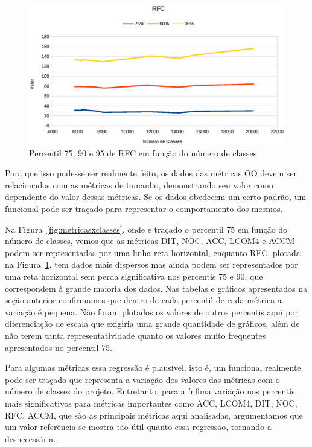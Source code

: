 \begin{figure}[!htb]
\centering
\includegraphics [keepaspectratio=true,scale=0.7]{figuras/rfcxclasses.eps}
\caption{Percentil 75, 90 e 95 de RFC em função do número de classes}
\label{fig:rfcxclasses}
\end{figure}

Para que isso pudesse ser realmente feito, os dados das métricas OO devem ser relacionados com as métricas de tamanho, demonstrando seu valor como dependente do valor dessas métricas. Se os dados obedecem um certo padrão, um funcional pode ser traçado para representar o comportamento dos mesmos. 

Na Figura~\ref{fig:metricasxclasses}, onde é traçado o percentil 75 em função do número de classes, vemos que as métricas DIT, NOC, ACC, LCOM4 e ACCM podem ser representadas por uma linha reta horizontal, enquanto RFC, plotada na Figura~\ref{fig:rfcxclasses}, tem dados mais dispersos mas ainda podem ser representados por uma reta horizontal sem perda significativa nos percentis 75 e 90, que correspondem à grande maioria dos dados. Nas tabelas e gráficos apresentados na seção anterior confirmamos que dentro de cada percentil de cada métrica a variação é pequena. Não foram plotados os valores de outros percentis aqui por diferenciação de escala que exigiria uma grande quantidade de gráficos, além de não terem tanta representatividade quanto os valores muito frequentes apresentados no percentil 75.

Para algumas métricas essa regressão é plausível, isto é, um funcional realmente pode ser traçado que representa a variação dos valores das métricas com o número de classes do projeto. Entretanto, para a ínfima variação nos percentis mais significativos para métricas importantes como ACC, LCOM4, DIT, NOC, RFC, ACCM, que são as principais métricas aqui analisadas, argumentamos que um valor referência se mostra tão útil quanto essa regressão, tornando-a desnecessária.

